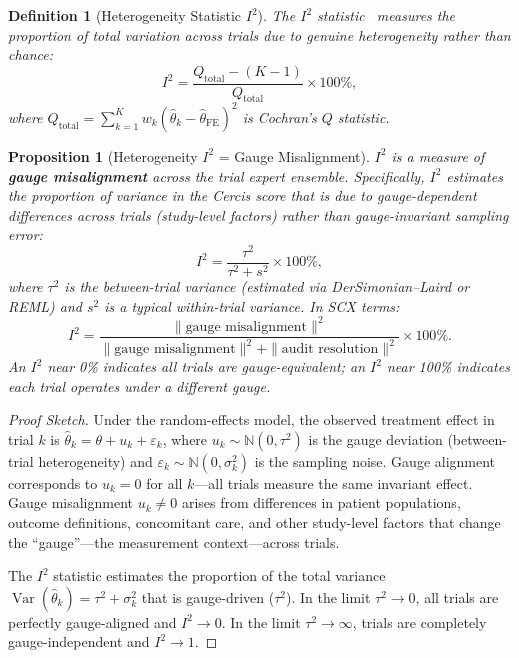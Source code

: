 \documentclass[12pt,a4paper]{article}
\newtheorem{proposition}[theorem]{Proposition}
\newtheorem{definition}[theorem]{Definition}
\theoremstyle{remark}
\newcommand{\N}{\mathbb{N}}
\newcommand{\SCX}{\textsf{SCX}}
\newcommand{\Cercis}{\textsf{Cercis}}
\DeclareMathOperator{\Var}{Var}
\begin{document}
\begin{definition}[Heterogeneity Statistic $I^2$]
\label{def:i_squared}
The $I^2$ statistic~\cite{higgins2003measuring} measures the proportion of
total variation across trials due to genuine heterogeneity rather than
chance:
\begin{equation}
  I^2 = \frac{Q_{\text{total}} - (K-1)}{Q_{\text{total}}} \times 100\%,
\end{equation}
where $Q_{\text{total}} = \sum_{k=1}^K w_k(\hat{\theta}_k -
\hat{\theta}_{\text{FE}})^2$ is Cochran's $Q$ statistic.
\end{definition}

\begin{proposition}[Heterogeneity $I^2$ = Gauge Misalignment]
\label{prop:i_squared_gauge}
$I^2$ is a measure of \textbf{gauge misalignment} across the trial expert
ensemble. Specifically, $I^2$ estimates the proportion of variance in the
\Cercis{} score that is due to gauge-dependent differences across trials
(study-level factors) rather than gauge-invariant sampling error:
\begin{equation}
  I^2 = \frac{\tau^2}{\tau^2 + s^2} \times 100\%,
\end{equation}
where $\tau^2$ is the between-trial variance (estimated via
DerSimonian--Laird or REML) and $s^2$ is a typical within-trial variance.
In \SCX{} terms:
\begin{equation}
  I^2 = \frac{\|\text{gauge misalignment}\|^2}{\|\text{gauge misalignment}\|^2
  + \|\text{audit resolution}\|^2} \times 100\%.
\end{equation}
An $I^2$ near 0\% indicates all trials are gauge-equivalent; an $I^2$
near 100\% indicates each trial operates under a different gauge.
\end{proposition}

\begin{proof}[Proof Sketch]
Under the random-effects model, the observed treatment effect in trial $k$
is $\hat{\theta}_k = \theta + u_k + \varepsilon_k$, where $u_k \sim
\N(0, \tau^2)$ is the gauge deviation (between-trial heterogeneity) and
$\varepsilon_k \sim \N(0, \sigma_k^2)$ is the sampling noise. Gauge
alignment corresponds to $u_k = 0$ for all $k$---all trials measure the
same invariant effect. Gauge misalignment $u_k \neq 0$ arises from
differences in patient populations, outcome definitions, concomitant care,
and other study-level factors that change the ``gauge''---the measurement
context---across trials.

The $I^2$ statistic estimates the proportion of the total variance
$\Var(\hat{\theta}_k) = \tau^2 + \sigma_k^2$ that is gauge-driven
($\tau^2$). In the limit $\tau^2 \to 0$, all trials are perfectly
gauge-aligned and $I^2 \to 0$. In the limit $\tau^2 \to \infty$, trials
are completely gauge-independent and $I^2 \to 1$.
\end{proof}
\end{document}
